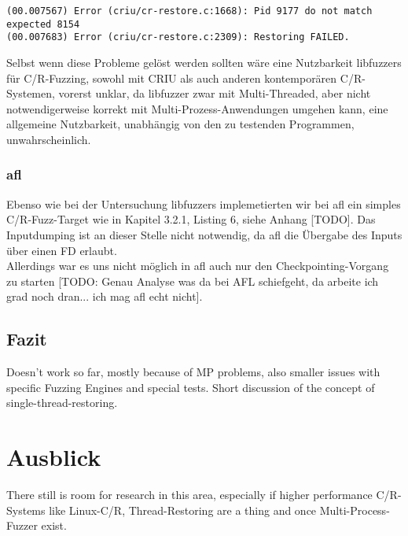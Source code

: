 \documentclass[a4paper]{article}
\begin{document}
\begin{lstlisting}[caption=Restoring Error durch PID mismatch]
(00.007567) Error (criu/cr-restore.c:1668): Pid 9177 do not match expected 8154
(00.007683) Error (criu/cr-restore.c:2309): Restoring FAILED.
\end{lstlisting}
Selbst wenn diese Probleme gelöst werden sollten wäre eine Nutzbarkeit libfuzzers für C/R-Fuzzing, sowohl mit CRIU als auch anderen kontemporären C/R-Systemen, vorerst unklar, da libfuzzer zwar mit Multi-Threaded, aber nicht notwendigerweise korrekt mit Multi-Prozess-Anwendungen umgehen kann, eine allgemeine Nutzbarkeit, unabhängig von den zu testenden Programmen, unwahrscheinlich.
\subsubsection{afl}
Ebenso wie bei der Untersuchung libfuzzers implemetierten wir bei afl ein simples C/R-Fuzz-Target wie in Kapitel 3.2.1, Listing 6, siehe Anhang [TODO]. Das Inputdumping ist an dieser Stelle nicht notwendig, da afl die Übergabe des Inputs über einen FD erlaubt.\\
Allerdings war es uns nicht möglich in afl auch nur den Checkpointing-Vorgang zu starten [TODO: Genau Analyse was da bei AFL schiefgeht, da arbeite ich grad noch dran... ich mag afl echt nicht].


\subsection{Fazit}
Doesn't work so far, mostly because of MP problems, also smaller issues with specific Fuzzing Engines and special tests. Short discussion of the concept of single-thread-restoring.

\section{Ausblick}
There still is room for research in this area, especially if higher performance C/R-Systems like Linux-C/R, Thread-Restoring are a thing and once Multi-Process-Fuzzer exist.
\end{document}
